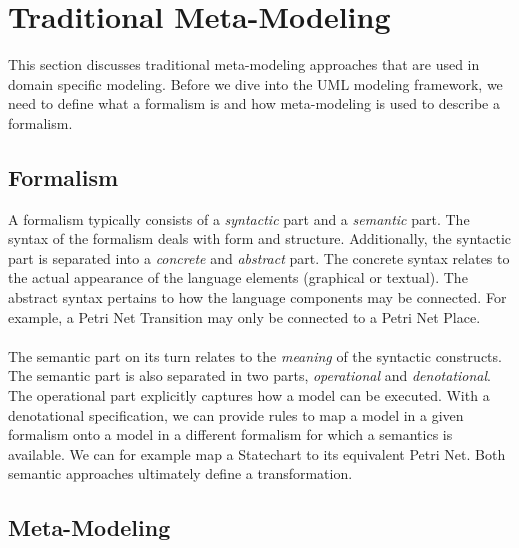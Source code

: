 \section{Traditional Meta-Modeling}

This section discusses traditional meta-modeling approaches that are used in domain specific modeling. Before we dive into the UML modeling framework, we need to define what a formalism is and how meta-modeling is used to describe a formalism.

\subsection{Formalism}

A formalism typically consists of a \textit{syntactic} part and a \textit{semantic} part. The syntax of the formalism deals with form and structure. Additionally, the syntactic part is separated into a \textit{concrete} and \textit{abstract} part. The concrete syntax relates to the actual appearance of the language elements (graphical or textual). The abstract syntax pertains to how the language components may be connected. For example, a Petri Net Transition may only be connected to a Petri Net Place.
\\ \\
The semantic part on its turn relates to the \textit{meaning} of the syntactic constructs. The semantic part is also separated in two parts, \textit{operational} and \textit{denotational}. The operational part explicitly captures how a model can be executed. With a denotational specification, we can provide rules to map a model in a given formalism onto a model in a different formalism for which a semantics is available. We can for example map a Statechart to its equivalent Petri Net. Both semantic approaches ultimately define a transformation.

\subsection{Meta-Modeling}


